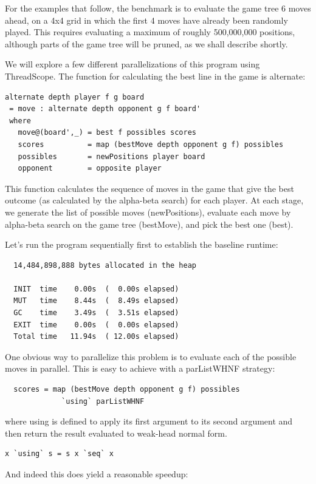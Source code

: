 \documentclass[twocolumn,9pt]{sigplanconf}
\newcommand{\codef}[1]{{\fontfamily{cmss}\small#1}}
\begin{document}
For the examples that follow, the benchmark is to evaluate the game
tree 6 moves ahead, on a 4x4 grid in which the first 4 moves have
already been randomly played.  This requires evaluating a maximum of
roughly 500,000,000 positions, although parts of the game tree will be
pruned, as we shall describe shortly.

We will explore a few different parallelizations of this program using
ThreadScope.  The function for calculating the best line in the game
is \codef{alternate}:

\begin{lstlisting}[columns=flexible]
alternate depth player f g board
 = move : alternate depth opponent g f board'
 where
   move@(board',_) = best f possibles scores
   scores          = map (bestMove depth opponent g f) possibles
   possibles       = newPositions player board
   opponent        = opposite player
\end{lstlisting}

This function calculates the sequence of moves in the game that give
the best outcome (as calculated by the alpha-beta search) for each
player.  At each stage, we generate the list of possible moves
(\codef{newPositions}), evaluate each move by alpha-beta search on the
game tree (\codef{bestMove}), and pick the best one (\codef{best}).

Let's run the program sequentially first to establish the baseline
runtime:

\begin{verbatim}
  14,484,898,888 bytes allocated in the heap

  INIT  time    0.00s  (  0.00s elapsed)
  MUT   time    8.44s  (  8.49s elapsed)
  GC    time    3.49s  (  3.51s elapsed)
  EXIT  time    0.00s  (  0.00s elapsed)
  Total time   11.94s  ( 12.00s elapsed)
\end{verbatim}

One obvious way to parallelize this problem is to evaluate each of the
possible moves in parallel.  This is easy to achieve with a
\codef{parListWHNF} strategy:

\begin{lstlisting}
  scores = map (bestMove depth opponent g f) possibles
             `using` parListWHNF
\end{lstlisting}
where \codef{using} is defined to apply its first argument to its second argument and then return the result evaluated to weak-head normal form.
\begin{lstlisting}
x `using` s = s x `seq` x
\end{lstlisting}
And indeed this does yield a reasonable speedup:
\end{document}
